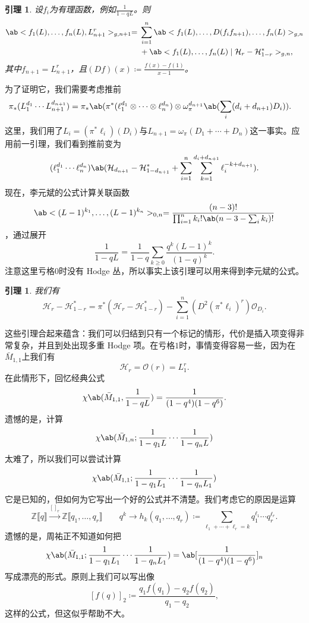 \documentclass{amsart}
\newtheorem{lem}[thm]{引理}
\theoremstyle{definition}
\theoremstyle{remark}
\theoremstyle{plain}
\theoremstyle{definition}
\theoremstyle{remark}
\newcommand{\Z}{\mathbb{Z}}
\newcommand{\mc}[1]{\mathcal{#1}}
\newcommand{\1}{\mathbf{1}}
\newcommand{\2}{\mathbf{2}}
\newcommand{\3}{\mathbf{3}}
\newcommand{\ps}[1]{\llbracket #1 \rrbracket}
\begin{document}
\begin{lem}
    设\(f_i\)为有理函数，例如\(\frac{1}{1-q L}\)。则
    \begin{align*}
        \ab<f_1(L), \ldots, f_n(L), L_{n+1}^r>_{g, n+1} ={}& \sum_{i=1}^n \ab<f_1(L), \ldots, D(f_i f_{n+1}), \ldots, f_n(L)>_{g, n} \\
        &+ \ab<f_1(L), \ldots, f_n(L) \mid \mc{H}_r - \mc{H}_{1-r}^*>_{g,n},
    \end{align*}
    其中\(f_{n+1} = L_{n+1}^r\)，且\((Df)(x) \coloneqq \frac{f(x)-f(1)}{x-1}\)。
\end{lem}

为了证明它，我们需要考虑推前
\begin{align*}
    \pi_* (L_1^{d_1} \cdots L_{n+1}^{d_{n+1}}) &= \pi_* \ab(\pi^*(\ell_1^{d_1} \otimes \cdots \otimes \ell_n^{d_n}) \otimes \omega_{\pi}^{d_{n+1}}\ab(\sum_i (d_i+d_{n+1})D_i)).
\end{align*}
这里，我们用了\(L_i = (\pi^* \ell_i)(D_i)\)与\(L_{n+1} = \omega_{\pi}(D_1 + \cdots + D_n)\)这一事实。应用前一引理，我们看到推前变为
\[ (\ell_1^{d_1} \cdots \ell_n^{d_n})\ab(\mc{H}_{d_{n+1}} - \mc{H}_{1-d_{n+1}}^* + \sum_{i=1}^n \sum_{k=1}^{d_i + d_{n+1}} \ell_i^{-k+d_{n+1}}). \]
现在，李元斌的公式计算关联函数
\[ \ab<(L-1)^{k_1}, \ldots, (L-1)^{k_n}>_{0,n} = \frac{(n-3)!}{\prod_{i=1}^n k_i! \ab(n-3-\sum_i k_i)!} \]
，通过展开
\[ \frac{1}{1-qL} = \frac{1}{1-q} \sum_{k \geq 0} \frac{q^k(L-1)^k}{(1-q)^k}. \]
注意这里亏格\(0\)时没有 Hodge 丛，所以事实上该引理可以用来得到李元斌的公式。

\begin{lem}
    我们有
    \[ \mc{H}_r - \mc{H}_{1-r}^* = \pi^* (\mc{H}_r - \mc{H}_{1-r}^*) - \sum_{i=1}^n (D^2 (\pi^* \ell_i)^r) \mc{O}_{D_i}. \]
\end{lem}

这些引理合起来蕴含：我们可以归结到只有一个标记的情形，代价是插入项变得非常复杂，并且到处出现多重 Hodge 项。在亏格\(1\)时，事情变得容易一些，因为在\(\bar{M}_{1,1}\)上我们有
\[ \mc{H}_r = \mc{O}(r) = L_1^r. \]
在此情形下，回忆经典公式
\[ \chi\ab(\bar{M}_{1,1}, \frac{1}{1-qL}) = \frac{1}{(1-q^4)(1-q^6)}. \]
遗憾的是，计算
\[ \chi\ab(\bar{M}_{1,n}; \frac{1}{1-q_1 L} \cdots \frac{1}{1-q_n L}) \]
太难了，所以我们可以尝试计算
\[ \chi\ab(\bar{M}_{1,1}; \frac{1}{1-q_1 L_1} \cdots \frac{1}{1-q_n L_1})  \]
它是已知的，但如何为它写出一个好的公式并不清楚。我们考虑它的原因是运算
\[ \Z\ps{q} \xrightarrow{[]_r} \Z\ps{q_1, \ldots, q_r} \qquad q^k \to h_k(q_1, \ldots, q_r) \coloneqq \sum_{\ell_1 + \cdots + \ell_r = k} q_1^{\ell_1} \cdots q_r^{\ell_r}. \]
遗憾的是，周祐正不知道如何把
\[ \chi\ab(\bar{M}_{1,1}; \frac{1}{1-q_1 L_1} \cdots \frac{1}{1-q_n L_1}) = \ab[\frac{1}{(1-q^4)(1-q^6)}]_n \]
写成漂亮的形式。原则上我们可以写出像
\[ [f(q)]_2 \coloneqq \frac{q_1 f(q_1) - q_2 f(q_2)}{q_1 - q_2}, \]
这样的公式，但这似乎帮助不大。
\end{document}
